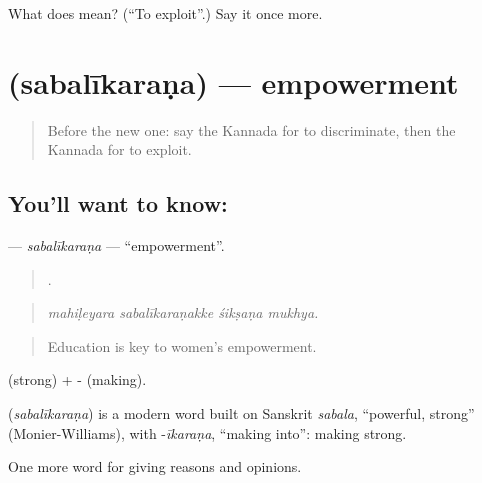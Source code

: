 \begin{tcolorbox}[breakable,colback=teal!4,colframe=teal!35!black,title={Before you move on}]
What does  mean? (\textquotedblleft{}To exploit\textquotedblright{}.) Say it once more.
\end{tcolorbox}
\section[\texorpdfstring{\kn{ಸಬಲೀಕರಣ} (sabalīkaraṇa)}{ಸಬಲೀಕರಣ (sabalīkaraṇa)}]{ (sabalīkaraṇa) — empowerment}

\label{lesson:KA-C391-sabalikarana}



\begin{quote}
Before the new one: say the Kannada for to discriminate, then the Kannada for to exploit.
\end{quote}

\subsection*{You'll want to know: }
\textbf{} — \emph{sabalīkaraṇa} — \textquotedblleft{}empowerment\textquotedblright{}.

\begin{quote}
   .
\end{quote}

\begin{quote}
\emph{mahiḷeyara sabalīkaraṇakke śikṣaṇa mukhya.}
\end{quote}

\begin{quote}
Education is key to women's empowerment.
\end{quote}

 (strong) + - (making).

\begin{cousinweb}
\textbf{} (\emph{sabalīkaraṇa}) is a modern word built on Sanskrit \emph{sabala}, \textquotedblleft{}powerful, strong\textquotedblright{} (Monier-Williams), with -\emph{īkaraṇa}, \textquotedblleft{}making into\textquotedblright{}: making strong.
\end{cousinweb}

\begin{grammarlens}[title={What you've built}]
One more word for giving reasons and opinions.
\end{grammarlens}

